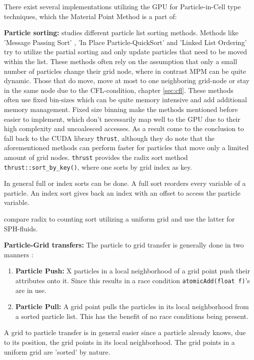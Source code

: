 \documentclass[m,times]{cgMA}
\begin{document}
There exist several implementations utilizing the GPU for Particle-in-Cell type techniques, which the Material Point Method is a part of:

\textbf{Particle sorting:} \cite{PIC:GPU} studies different particle list sorting methods. Methods like 'Message Passing Sort' \cite{kong2011particle} \cite{decyk2011adaptable}, 'In Place Particle-QuickSort' \cite{stantchev2008fast} and 'Linked List Ordering' \cite{burau2010picongpu} try to utilize the partial sorting and only update particles that need to be moved within the list. These methods often rely on the assumption that only a small number of particles change their grid node, where in contrast MPM can be quite dynamic. Those that do move, move at most to one neighboring grid-node or stay in the same node due to the CFL-condition, chapter \ref{sec:cfl}. These methods often use fixed bin-sizes which can be quite memory intensive and add additional memory management. Fixed size binning make the methods mentioned before easier to implement, which don't necessarily map well to the GPU due to their high complexity and uncoalesced accesses. As a result \cite{PIC:GPU} come to the conclusion to fall back to the CUDA library \texttt{thrust}, although they do note that the aforementioned methods can perform faster for particles that move only a limited amount of grid nodes. \texttt{thrust} provides the radix sort method \texttt{thrust::sort\_by\_key()}, where one sorts by grid index as key.

In general full or index sorts can be done. A full sort reorders every variable of a particle. An index sort gives back an index with an offset to access the particle variable.

\cite{NVIDIA:NNSEARCH} compare radix to counting sort utilizing a uniform grid and use the latter for SPH-fluids.

\textbf{Particle-Grid transfers:} The particle to grid transfer is generally done in two manners \cite{stantchev2008fast}:
\begin{enumerate}
  \item \textbf{Particle Push:} X particles in a local neighborhood of a grid point push their attributes onto it. Since this results in a race condition \texttt{atomicAdd(float f)}'s are in use.
  \item \textbf{Particle Pull:} A grid point pulls the particles in its local neighborhood from a sorted particle list. This has the benefit of no race conditions being present.
\end{enumerate}
A grid to particle transfer is in general easier since a particle already knows, due to its position, the grid points in its local neighborhood. The grid points in a uniform grid are 'sorted' by nature.
\end{document}
